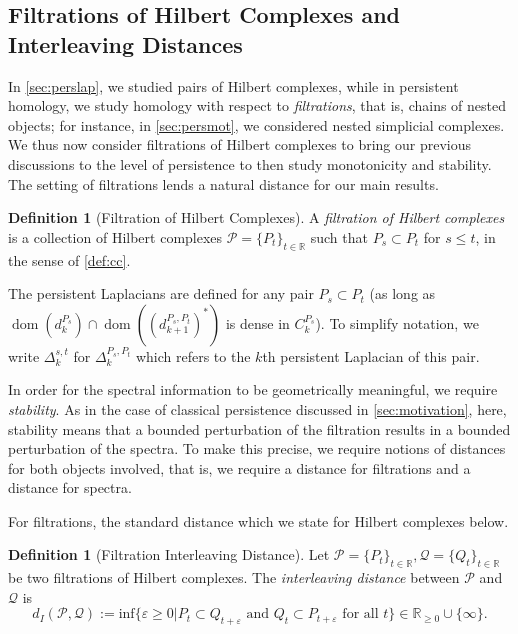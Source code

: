 \documentclass[11pt]{article}
\theoremstyle{definition}
\newtheorem{definition}[theorem]{Definition}
\theoremstyle{remark}
\DeclareMathOperator\dom{dom}
\newcommand{\Pp}{\mathcal{P}}
\newcommand{\Qq}{\mathcal{Q}}
\newcommand{\R}{\mathbb{R}}
\begin{document}
\subsection{Filtrations of Hilbert Complexes and Interleaving Distances} \label{subsec:distances}

In \cref{sec:perslap}, we studied pairs of Hilbert complexes, while in persistent homology, we study homology with respect to \emph{filtrations}, that is, chains of nested objects; for instance, in \cref{sec:persmot}, we considered nested simplicial complexes. We thus now consider filtrations of Hilbert complexes to bring our previous discussions to the level of persistence to then study monotonicity and stability. The setting of filtrations lends a natural distance for our main results.

\begin{definition}[Filtration of Hilbert Complexes]
A \textit{filtration of Hilbert complexes} is a collection of Hilbert complexes $\Pp =\{P_t\}_{t \in \mathbb{R}}$ such that $P_s \subset P_t$ for $s \leq t$, in the sense of \cref{def:cc}.
\end{definition}

The persistent Laplacians are defined for any pair $P_s \subset P_t$ (as long as $\dom(d_k^{P_s})\cap \dom\left((d_{k+1}^{P_s,P_t})^*\right)$ is dense in $C_k^{P_s}$). To simplify notation, we write $\Delta^{s,t}_k$ for $\Delta^{P_s, P_t}_k$ which refers to the $k$th persistent Laplacian of this pair.
 
In order for the spectral information to be geometrically meaningful, we require \emph{stability}. As in the case of classical persistence discussed in \cref{sec:motivation}, here, stability means that a bounded perturbation of the filtration results in a bounded perturbation of the spectra. To make this precise, we require notions of distances for both objects involved, that is, we require a distance for filtrations and a distance for spectra.

For filtrations, the standard distance \citep{chazal_proximity_2009,mww} which we state for Hilbert complexes below.

\begin{definition}[Filtration Interleaving Distance] \label{defn:intfil}
    Let $\Pp = \{P_{t}\}_{t \in \mathbb{R}}, \Qq = \{Q_{t}\}_{t \in \mathbb{R}}$ be two filtrations of Hilbert complexes.
    The \emph{interleaving distance} between $\Pp$ and $\Qq$ is
    \[
    d_{I}(\Pp, \Qq) := \text{inf}\{\varepsilon \geq 0 \rvert P_{t} \subset Q_{t+\varepsilon} \text{ and } Q_{t} \subset P_{t+\varepsilon} \text{ for all } t\} \in \R_{\ge 0} \cup \{\infty\}.
    \]
\end{definition}
\end{document}
